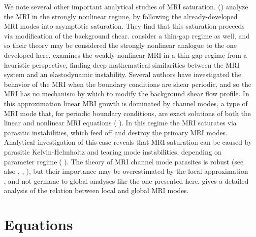 \documentclass{emulateapj}
\newcommand{\citei}[1]{\citeauthor{#1} \citeyear{#1}}
\begin{document}
We note several other important analytical studies of MRI saturation. \citeauthor{Knobloch:2005ba} (\citeyear{Knobloch:2005ba}) analyze the MRI in the strongly nonlinear regime, by following the already-developed MRI modes into asymptotic saturation. They find that this saturation proceeds via modification of the background shear. \citeauthor{Knobloch:2005ba} consider a thin-gap regime as well, and so their theory may be considered the strongly nonlinear analogue to the one developed here. \citei{Vasil:2015} examines the weakly nonlinear MRI in a thin-gap regime from a heuristic perspective, finding deep mathematical similarities between the MRI system and an elastodynamic instability. Several authors have investigated the behavior of the MRI when the boundary conditions are shear periodic, and so the MRI has no mechanism by which to modify the background shear flow profile. In this approximation linear MRI growth is dominated by channel modes, a type of MRI mode that, for periodic boundary conditions, are exact solutions of both the linear and nonlinear MRI equations (\citei{Goodman:1994ul}). In this regime the MRI saturates via parasitic instabilities, which feed off and destroy the primary MRI modes. Analytical investigation of this case reveals that MRI saturation can be caused by parasitic Kelvin-Helmholtz and tearing mode instabilities, depending on parameter regime (\citei{Pessah:2010ic}). The theory of MRI channel mode parasites is robust (see also \citei{Pessah:2009gm}, \citei{Latter:2010iz}, \citei{Rembiasz:2016}), but their importance may be overestimated by the local approximation \citei{Latter:2015}, and not germane to global analyses like the one presented here. \citei{Latter:2015} gives a  detailed analysis of the relation between local and global MRI modes.


\section{Equations}\label{sec:equations}
\end{document}
